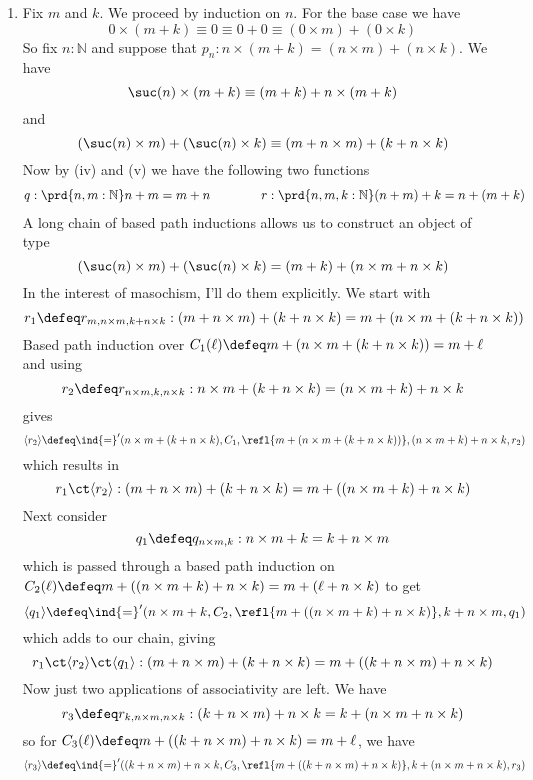 \begin{enumerate}
\item Fix $m$ and $k$.  We proceed by induction on $n$.  For the base case we
have
\[
  0 \times (m + k)
  \equiv 0
  \equiv 0 + 0
  \equiv (0 \times m) + (0 \times k)
\]
So fix $n : \mathbb{N}$ and suppose that $p_{n} : n \times (m + k) = (n \times
m) + (n \times k)$.  We have
\[
  \suc(n) \times (m + k)
  \equiv
  (m+k) + n \times (m + k)
\]
and
\[
  (\suc(n) \times m) + (\suc(n) \times k)
  \equiv
  (m + n \times m) + (k + n \times k)
\]
Now by (iv) and (v) we have the following two functions
\begin{align*}
  q : \prd{n, m:\mathbb{N}} n + m = m + n
  \qquad\qquad
  r : \prd{n, m, k:\mathbb{N}} (n + m) + k = n + (m + k)
\end{align*}
A long chain of based path inductions allows us to construct an object of type
\[
  (\suc(n) \times m) + (\suc(n) \times k) = (m+k) + (n \times m + n \times k)
\]
In the interest of masochism, I'll do them explicitly.  We start with
\[
  r_{1} \defeq r_{m, n \times m, k+n\times k} 
  : (m + n \times m) + (k + n \times k)
  = m + (n \times m + (k + n \times k))
\]
Based path induction over $C_{1}(\ell) \defeq m + (n \times m + (k + n \times
k)) = m + \ell$ and using
\[
  r_{2} \defeq r_{n \times m, k, n \times k}
  : n \times m + (k + n \times k)
  = (n \times m + k) + n \times k
\]
gives
\[
  \langle r_{2} \rangle \defeq 
  \ind{=}'(n\times m + (k + n \times k), C_{1}, \refl{m+(n\times m + (k + n
  \times k))}, (n \times m + k) + n \times k, r_{2}
  )
\]
which results in
\[
  r_{1} 
  \ct
  \langle r_{2} \rangle
  :
  (m + n \times m) + (k + n \times k)
  =
  m + ((n \times m + k) + n \times k)
\]
Next consider
\[
  q_{1} \defeq q_{n\times m, k} : n \times m + k = k + n \times m
\]
which is passed through a based path induction on $C_{2}(\ell) \defeq m + ((n
\times m + k) + n \times k) =  m + (\ell
+ n \times k)$ to get
\[
\langle q_{1} \rangle
\defeq
\ind{=}'(n \times m + k, C_{2}, \refl{m + ((n \times m + k) + n \times k)}, k + n
\times m, q_{1})
\]
which adds to our chain, giving
\[
  r_{1} \ct \langle r_{2} \rangle \ct \langle q_{1} \rangle
  :
  (m + n \times m) + (k + n \times k)
  =
  m + ((k + n \times m) + n \times k)
\]
Now just two applications of associativity are left.  We have
\[
  r_{3} \defeq r_{k, n \times m, n \times k}
  :
  (k + n \times m) + n \times k
  =
  k + (n \times m + n \times k)
\]
so for $C_{3}(\ell) \defeq m + ((k + n \times m) + n \times k) = m + \ell$, we have
\[
\langle r_{3} \rangle \defeq
\ind{=}'((k + n \times m) + n \times k, C_{3}, \refl{m + ((k + n \times m) + n
\times k)}, k + (n \times m + n \times k), r_{3})
\]
\end{enumerate}

